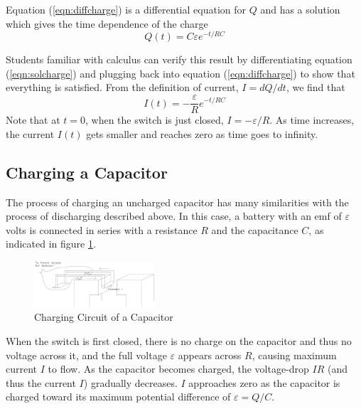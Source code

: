 Equation (\ref{eqn:diffcharge}) is a differential equation for $Q$ and has a solution which gives the time dependence of the charge
\begin{equation}
    Q(t) = C\varepsilon e^{-t/RC}
    \label{eqn:solcharge}
\end{equation}

Students familiar with calculus can verify this result by differentiating equation (\ref{eqn:solcharge}) and plugging back into equation (\ref{eqn:diffcharge}) to show that everything is satisfied. From the definition of current, $I = dQ/dt$, we find that
\begin{equation}
    I(t) = -\frac{\varepsilon}{R}e^{-t/RC}
    \label{eqn:dischargecurrent}
\end{equation}
Note that at $t=0$, when the switch is just closed, $I = -\varepsilon/R$. As time increases, the current $I(t)$ gets smaller and reaches zero as time goes to infinity.

\subsection{Charging a Capacitor}

The process of charging an uncharged capacitor has many similarities with the process of discharging described above. In this case, a battery with an emf of $\varepsilon$ volts is connected in series with a resistance $R$ and the capacitance $C$, as indicated in figure \ref{fig:chargecircuit}.

\begin{figure}[h]
    \begin{center}
        \includegraphics[width=0.4\textwidth]{./Exp4/pic/image3.png}
    \end{center}
    \caption{Charging Circuit of a Capacitor}
    \label{fig:chargecircuit}
\end{figure}

When the switch is first closed, there is no charge on the capacitor and thus no voltage across it, and the full voltage $\varepsilon$ appears across $R$, causing maximum current $I$ to flow. As the capacitor becomes charged, the voltage-drop $IR$ (and thus the current $I$) gradually decreases. $I$ approaches zero as the capacitor is charged toward its maximum potential difference of $\varepsilon = Q/C$. \myskip

